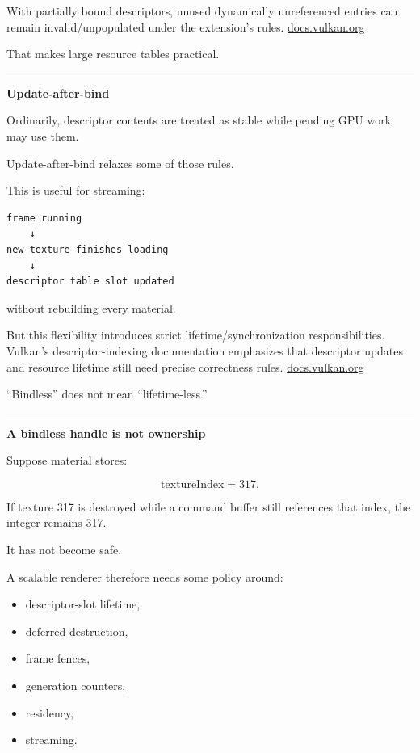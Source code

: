 With partially bound descriptors, unused dynamically unreferenced entries can remain invalid/unpopulated under the extension's rules. \href{https://docs.vulkan.org/spec/latest/chapters/descriptorsets.html?utm_source=chatgpt.com}{docs.vulkan.org}

That makes large resource tables practical.

\begin{center}\rule{0.5\linewidth}{0.5pt}\end{center}

\textbf{Update-after-bind}

Ordinarily, descriptor contents are treated as stable while pending GPU work may use them.

Update-after-bind relaxes some of those rules.

This is useful for streaming:

\begin{verbatim}
frame running
    ↓
new texture finishes loading
    ↓
descriptor table slot updated
\end{verbatim}

without rebuilding every material.

But this flexibility introduces strict lifetime/synchronization responsibilities. Vulkan's descriptor-indexing documentation emphasizes that descriptor updates and resource lifetime still need precise correctness rules. \href{https://docs.vulkan.org/tutorial/latest/Building_a_Simple_Engine/Advanced_Topics/Descriptor_Indexing_UpdateAfterBind.html?utm_source=chatgpt.com}{docs.vulkan.org}

``Bindless'' does not mean ``lifetime-less.''

\begin{center}\rule{0.5\linewidth}{0.5pt}\end{center}

\textbf{A bindless handle is not ownership}

Suppose material stores:

\[
\text{textureIndex}=317.
\]

If texture 317 is destroyed while a command buffer still references that index, the integer remains 317.

It has not become safe.

A scalable renderer therefore needs some policy around:

\begin{itemize}
\tightlist
\item
  descriptor-slot lifetime,
\item
  deferred destruction,
\item
  frame fences,
\item
  generation counters,
\item
  residency,
\item
  streaming.
\end{itemize}

